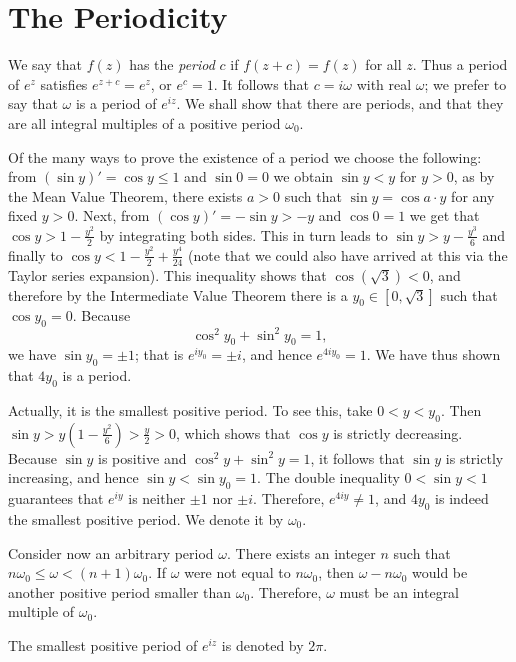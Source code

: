  \section{The Periodicity}
 We say that $f(z)$ has the \emph{period} $c$ if $f(z+c)=f(z)$ for all $z$. Thus a period of $e^z$ satisfies $e^{z+c}=e^z$, or $e^c=1$. It follows that $c=i\omega$ with real $\omega$; we prefer to say that $\omega$ is a period of $e^{iz}$. We shall show that there are periods, and that they are all integral multiples of a positive period $\omega_0$.
 
 Of the many ways to prove the existence of a period we choose the following: from $(\sin y)'=\cos y \le 1$ and $\sin 0=0$ we obtain $\sin y<y$ for $y>0$, as by the Mean Value Theorem, there exists $a>0$ such that $\sin y=\cos a \cdot y$ for any fixed $y>0$. Next, from $(\cos y)'=-\sin y>-y$ and $\cos 0=1$ we get that $\cos y>1-\frac{y^2}{2}$ by integrating both sides. This in turn leads to $\sin y>y-\frac{y^3}{6}$ and finally to $\cos y<1-\frac{y^2}{2}+\frac{y^4}{24}$ (note that we could also have arrived at this via the Taylor series expansion). This inequality shows that $\cos(\sqrt{3})<0$, and therefore by the Intermediate Value Theorem there is a $y_0 \in [0,\sqrt{3}]$ such that $\cos y_0=0$. Because $$\cos^2 y_0+\sin^2 y_0=1,$$ we have $\sin y_0=\pm 1$; that is $e^{iy_0}=\pm i$, and hence $e^{4iy_0}=1$. We have thus shown that $4y_0$ is a period.
 
 Actually, it is the smallest positive period. To see this, take $0<y<y_0$. Then $\sin y>y\left(1-\frac{y^2}{6}\right)>\frac{y}{2}>0$, which shows that $\cos y$ is strictly decreasing. Because $\sin y$ is positive and $\cos^2 y+\sin^2 y=1$, it follows that $\sin y$ is strictly increasing, and hence $\sin y<\sin y_0=1$. The double inequality $0<\sin y<1$ guarantees that $e^{iy}$ is neither $\pm 1$ nor $\pm i$. Therefore, $e^{4iy} \neq 1$, and $4y_0$ is indeed the smallest positive period. We denote it by $\omega_0$.
 
 Consider now an arbitrary period $\omega$. There exists an integer $n$ such that $n\omega_0 \le \omega<(n+1)\omega_0$. If $\omega$ were not equal to $n\omega_0$, then $\omega-n\omega_0$ would be another positive period smaller than $\omega_0$. Therefore, $\omega$ must be an integral multiple of $\omega_0$.
 
 \begin{definition}
 	The smallest positive period of $e^{iz}$ is denoted by $2\pi$.
 \end{definition}
 
